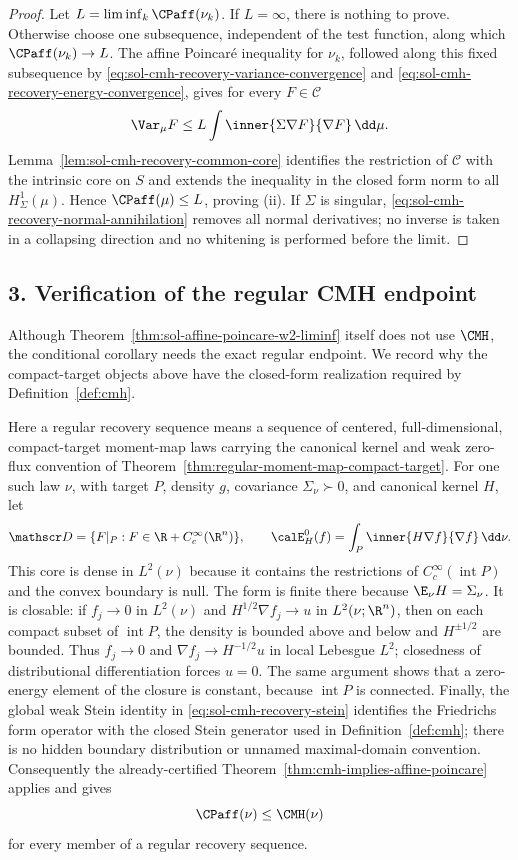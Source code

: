 \documentclass[../main.tex]{subfiles}
\begin{document}
\begin{proof}
Let $L=\liminf_k\CPaff(\nu_k)$.  If $L=\infty$, there is nothing to prove.  Otherwise choose
one subsequence, independent of the test function, along which
$\CPaff(\nu_k)\to L$.  The affine Poincar\'e inequality for $\nu_k$, followed along this fixed
subsequence by \eqref{eq:sol-cmh-recovery-variance-convergence} and
\eqref{eq:sol-cmh-recovery-energy-convergence}, gives for every $F\in\mathscr C$
\[
  \Var_\mu F
  \le L\int\inner{\Sigma\nabla F}{\nabla F}\,\dd\mu.
\]
Lemma~\ref{lem:sol-cmh-recovery-common-core} identifies the restriction of $\mathscr C$ with the
intrinsic core on $S$ and extends the inequality in the closed form norm to all
$H^1_\Sigma(\mu)$.  Hence $\CPaff(\mu)\le L$, proving (ii).  If $\Sigma$ is singular,
\eqref{eq:sol-cmh-recovery-normal-annihilation} removes all normal derivatives; no inverse is
taken in a collapsing direction and no whitening is performed before the limit.
\end{proof}

\subsection*{3. Verification of the regular CMH endpoint}

Although Theorem~\ref{thm:sol-affine-poincare-w2-liminf} itself does not use $\CMH$, the
conditional corollary needs the exact regular endpoint.  We record why the compact-target
objects above have the closed-form realization required by Definition~\ref{def:cmh}.

Here a regular recovery sequence means a sequence of centered, full-dimensional,
compact-target moment-map laws carrying the canonical kernel and weak zero-flux convention of
Theorem~\ref{thm:regular-moment-map-compact-target}.  For one such law $\nu$, with target $P$,
density $g$, covariance $\Sigma_\nu\succ0$, and canonical kernel $H$, let
\[
  \mathscr D=\{F|_P:F\in\R+C_c^\infty(\R^n)\},
  \qquad
  \calE_H^0(f)=\int_P\inner{H\nabla f}{\nabla f}\,\dd\nu.
\]
This core is dense in $L^2(\nu)$ because it contains the restrictions of
$C_c^\infty(\operatorname{int}P)$ and the convex boundary is null.  The form is finite there
because $\E_\nu H=\Sigma_\nu$.  It is closable: if
$f_j\to0$ in $L^2(\nu)$ and $H^{1/2}\nabla f_j\to u$ in $L^2(\nu;\R^n)$, then on each compact
subset of $\operatorname{int}P$, the density is bounded above and below and $H^{\pm1/2}$ are
bounded.  Thus $f_j\to0$ and $\nabla f_j\to H^{-1/2}u$ in local Lebesgue $L^2$; closedness of
distributional differentiation forces $u=0$.  The same argument shows that a zero-energy
element of the closure is constant, because $\operatorname{int}P$ is connected.  Finally, the
global weak Stein identity in \eqref{eq:sol-cmh-recovery-stein} identifies the Friedrichs form
operator with the closed Stein generator used in Definition~\ref{def:cmh}; there is no hidden
boundary distribution or unnamed maximal-domain convention.  Consequently the already-certified
Theorem~\ref{thm:cmh-implies-affine-poincare} applies and gives
\begin{equation}
  \CPaff(\nu)\le\CMH(\nu)
  \label{eq:sol-cmh-recovery-regular-endpoint}
\end{equation}
for every member of a regular recovery sequence.
\end{document}
